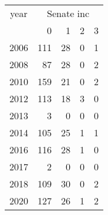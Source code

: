 \footnotesize\begin{tabular}[t]{lrrrr}
\toprule
\multicolumn{1}{c}{year} & \multicolumn{4}{c}{Senate inc} \\
\cmidrule(l{3pt}r{3pt}){1-1} \cmidrule(l{3pt}r{3pt}){2-5}
  & 0 & 1 & 2 & 3\\
\midrule
2006 & 111 & 28 & 0 & 1\\
2008 & 87 & 28 & 0 & 2\\
2010 & 159 & 21 & 0 & 2\\
2012 & 113 & 18 & 3 & 0\\
2013 & 3 & 0 & 0 & 0\\
2014 & 105 & 25 & 1 & 1\\
2016 & 116 & 28 & 1 & 0\\
2017 & 2 & 0 & 0 & 0\\
2018 & 109 & 30 & 0 & 2\\
2020 & 127 & 26 & 1 & 2\\
\bottomrule
\end{tabular}
